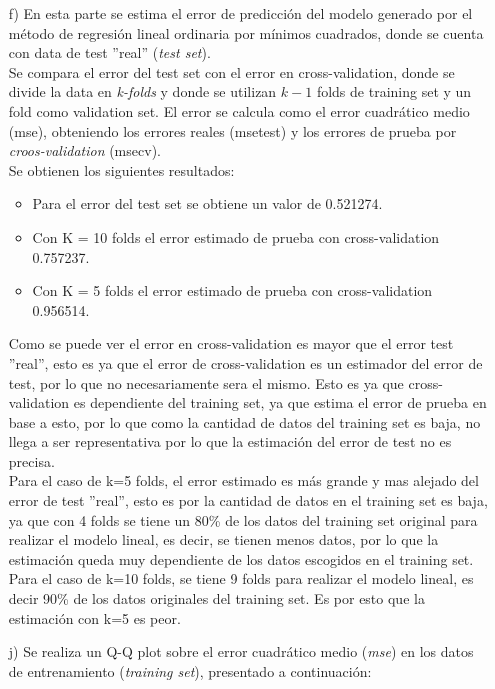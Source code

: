 \documentclass[10pt]{article}
\begin{document}
\begin{itemize}
\item[f)] En esta parte se estima el error de predicción del modelo generado por el método de regresión lineal ordinaria por mínimos cuadrados, donde se cuenta con data de test ''real'' (\textit{test set}).\\
Se compara el error del test set con el error en cross-validation, donde se divide la data en \textit{k-folds} y donde se utilizan $k-1$ folds de training set y un fold como validation set. El error se calcula como el error cuadrático medio (mse), obteniendo los errores reales (msetest) y los errores de prueba por \textit{croos-validation} (msecv).\\

Se obtienen los siguientes resultados:

\begin{itemize}
\item Para el error del test set se obtiene un valor de 0.521274.
\item Con K = 10 folds el error estimado de prueba con cross-validation  0.757237.
\item Con K = 5 folds el error estimado de prueba con cross-validation  0.956514.
\end{itemize}

Como se puede ver el error en cross-validation es mayor que el error test ''real'', esto es ya que el error de cross-validation es un estimador del error de test, por lo que no necesariamente sera el mismo. Esto es ya que cross-validation es dependiente del training set, ya que estima el error de prueba en base a esto, por lo que como la cantidad de datos del training set es baja, no llega a ser representativa por lo que la estimación del error de test no es precisa. \\

Para el caso de k=5 folds, el error estimado es más grande y mas alejado del error de test ''real'', esto es por la cantidad de datos en el training set es baja, ya que con 4 folds se tiene un 80\%  de los datos del training set original para realizar el modelo lineal, es decir, se tienen menos datos, por lo que la estimación queda muy dependiente de los datos escogidos en el training set. Para el caso de k=10 folds, se tiene 9 folds para realizar el modelo lineal, es decir 90\% de los datos originales del training set. Es por esto que la estimación con k=5 es peor.

\newpage
\item[j)] Se realiza un Q-Q plot sobre el error cuadrático medio (\textit{mse}) en los datos de entrenamiento (\textit{training set}), presentado a continuación:\\


\end{itemize}
\end{document}
